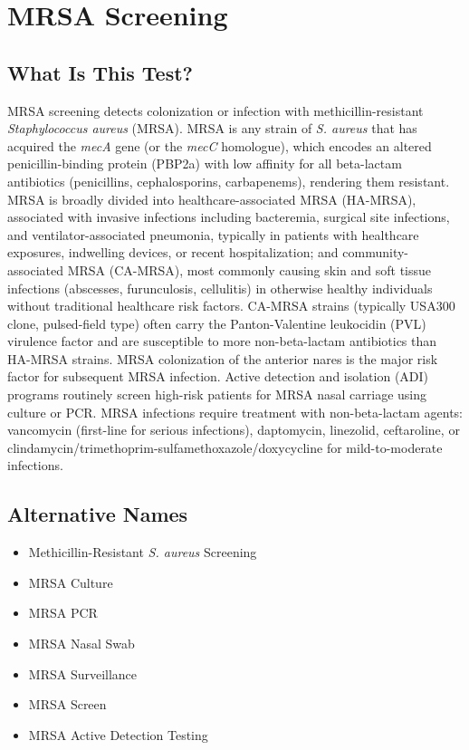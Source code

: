 \chapter{MRSA Screening}

\section*{What Is This Test?}
MRSA screening detects colonization or infection with methicillin-resistant \textit{Staphylococcus aureus} (MRSA). MRSA is any strain of \textit{S. aureus} that has acquired the \textit{mecA} gene (or the \textit{mecC} homologue), which encodes an altered penicillin-binding protein (PBP2a) with low affinity for all beta-lactam antibiotics (penicillins, cephalosporins, carbapenems), rendering them resistant. MRSA is broadly divided into healthcare-associated MRSA (HA-MRSA), associated with invasive infections including bacteremia, surgical site infections, and ventilator-associated pneumonia, typically in patients with healthcare exposures, indwelling devices, or recent hospitalization; and community-associated MRSA (CA-MRSA), most commonly causing skin and soft tissue infections (abscesses, furunculosis, cellulitis) in otherwise healthy individuals without traditional healthcare risk factors. CA-MRSA strains (typically USA300 clone, pulsed-field type) often carry the Panton-Valentine leukocidin (PVL) virulence factor and are susceptible to more non-beta-lactam antibiotics than HA-MRSA strains. MRSA colonization of the anterior nares is the major risk factor for subsequent MRSA infection. Active detection and isolation (ADI) programs routinely screen high-risk patients for MRSA nasal carriage using culture or PCR. MRSA infections require treatment with non-beta-lactam agents: vancomycin (first-line for serious infections), daptomycin, linezolid, ceftaroline, or clindamycin/trimethoprim-sulfamethoxazole/doxycycline for mild-to-moderate infections.

\section*{Alternative Names}
\begin{itemize}
  \item Methicillin-Resistant \textit{S. aureus} Screening
  \item MRSA Culture
  \item MRSA PCR
  \item MRSA Nasal Swab
  \item MRSA Surveillance
  \item MRSA Screen
  \item MRSA Active Detection Testing
\end{itemize}
